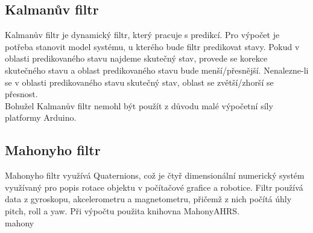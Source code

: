 \subsection{Kalmanův filtr}
Kalmanův filtr je dynamický filtr, který pracuje s predikcí. Pro výpočet je potřeba stanovit model systému, u kterého bude filtr predikovat stavy. Pokud v oblasti predikovaného stavu najdeme skutečný stav, provede se korekce skutečného stavu a oblast predikovaného stavu bude menší/přesnější. Nenalezne-li se v oblasti predikovaného stavu skutečný stav, oblast se zvětší/zhorší se přesnost.\\
Bohužel Kalmanův filtr nemohl být použít z důvodu malé výpočetní síly platformy Arduino.

\subsection{Mahonyho filtr}
Mahonyho filtr využívá Quaternions, což je čtyř dimensionální numerický systém využívaný pro popis rotace objektu v počítačové grafice a robotice. Filtr používá data z gyroskopu, akcelerometru a magnetometru, přičemž z nich počítá úhly pitch, roll a yaw. Při výpočtu použita knihovna MahonyAHRS.\\
mahony

